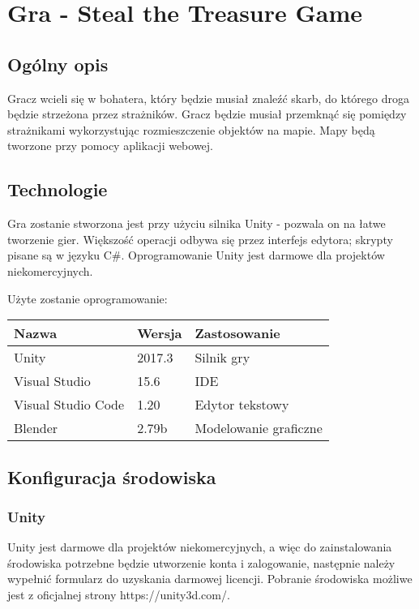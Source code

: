 \documentclass{article}
\begin{document}
\section{Gra - Steal the Treasure Game}
\subsection{Ogólny opis}
\par Gracz wcieli się w bohatera, który będzie musiał znaleźć skarb, do którego droga będzie strzeżona przez strażników. Gracz będzie musiał przemknąć się pomiędzy strażnikami wykorzystując rozmieszczenie objektów na mapie. Mapy będą tworzone przy pomocy aplikacji webowej. 

\subsection{Technologie}

Gra zostanie stworzona jest przy użyciu silnika Unity - pozwala on na łatwe tworzenie gier. Większość operacji odbywa się przez interfejs edytora; skrypty pisane są w języku C\#. Oprogramowanie Unity jest darmowe dla projektów niekomercyjnych. 

\par Użyte zostanie oprogramowanie:
\begin{table}[H]
	\centering
	\begin{tabular}{|l|l|l|}
		\hline
		Nazwa              & Wersja & Zastosowanie    \\ \hline
		Unity              & 2017.3 & Silnik gry      \\ \hline
		Visual Studio      & 15.6   & IDE             \\ \hline
		Visual Studio Code & 1.20   & Edytor tekstowy \\ \hline
        Blender			   & 2.79b  & Modelowanie graficzne \\ \hline
	\end{tabular}
\end{table}

\subsection{Konfiguracja środowiska}
\subsubsection{Unity}

Unity jest darmowe dla projektów niekomercyjnych, a więc do zainstalowania środowiska potrzebne będzie utworzenie konta i zalogowanie, następnie należy wypełnić formularz do uzyskania darmowej licencji. Pobranie środowiska możliwe jest z oficjalnej strony https://unity3d.com/. 
\end{document}
